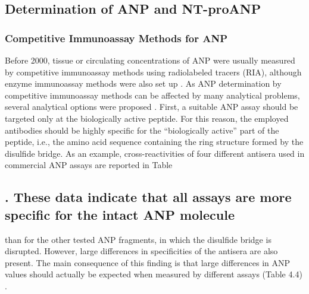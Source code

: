 \documentclass[14pt,a4paper,onecolumn]{extarticle}
\begin{document}
\subsection{ Determination of ANP and NT-proANP}

\subsubsection{ Competitive Immunoassay Methods for ANP}

Before 2000, tissue or circulating concentrations of ANP were usually measured by competitive immunoassay methods using radiolabeled tracers (RIA), although enzyme
immunoassay methods were also set up \citep{bib216} \citep{bib217} \citep{bib218} \citep{bib219} \citep{bib220} \citep{bib221} \citep{bib222} \citep{bib223} \citep{bib224} \citep{bib225} \citep{bib226} \citep{bib227} \citep{bib228} \citep{bib229} \citep{bib230} \citep{bib231} \citep{bib232}. As ANP determination by competitive
immunoassay methods can be affected by many analytical problems, several analytical
options were proposed \citep{bib21} \citep{bib22} \citep{bib229} \citep{bib230}. First, a suitable ANP assay should be targeted only
at the biologically active peptide. For this reason, the employed antibodies should be highly specific for the “biologically active” part of the peptide, i.e., the amino acid sequence
containing the ring structure formed by the disulfide bridge. As an example, cross-reactivities of four different antisera used in commercial ANP assays are reported in Table
\subsection{. These data indicate that all assays are more specific for the intact ANP molecule}
than for the other tested ANP fragments, in which the disulfide bridge is disrupted.
However, large differences in specificities of the antisera are also present. The main
consequence of this finding is that large differences in ANP values should actually be
expected when measured by different assays (Table 4.4) \citep{bib21} \citep{bib22} \citep{bib229} \citep{bib230}.
\end{document}

